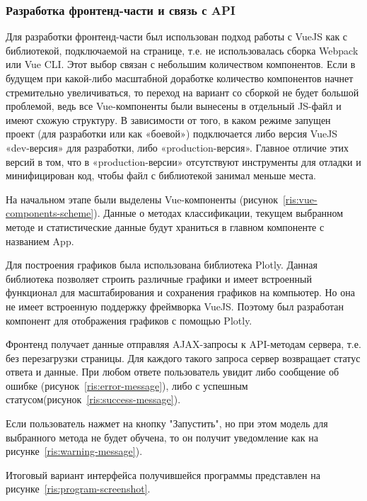 \subsubsection{Разработка фронтенд-части и связь с API}
Для разработки фронтенд-части был использован подход работы с VueJS как с библиотекой, подключаемой на странице, т.е. не использовалась сборка Webpack или Vue CLI. Этот выбор связан с небольшим количеством компонентов. Если в будущем при какой-либо масштабной доработке количество компонентов начнет стремительно увеличиваться, то переход на вариант со сборкой не будет большой проблемой, ведь все Vue-компоненты были вынесены в отдельный JS-файл и имеют схожую структуру. В зависимости от того, в каком режиме запущен проект (для разработки или как «боевой») подключается либо версия VueJS «dev-версия» для разработки, либо «production-версия». Главное отличие этих версий в том, что в «production-версии» отсутствуют инструменты для отладки и минифицирован код, чтобы файл с библиотекой занимал меньше места.
\par
На начальном этапе были выделены Vue-компоненты (рисунок~\ref{ris:vue-components-scheme}). Данные о методах классификации, текущем выбранном методе и статистические данные будут храниться в главном компоненте с названием App.
\par
Для построения графиков была использована библиотека Plotly. Данная библиотека позволяет строить различные графики и имеет встроенный функционал для масштабирования и сохранения графиков на компьютер. Но она не имеет встроенную поддержку фреймворка VueJS. Поэтому был разработан компонент для отображения графиков с помощью Plotly.
\par
Фронтенд получает данные отправляя AJAX-запросы к API-методам сервера, т.е. без перезагрузки страницы. Для каждого такого запроса сервер возвращает статус ответа и данные. При любом ответе пользователь увидит либо сообщение об ошибке (рисунок~\ref{ris:error-message}), либо с успешным статусом(рисунок~\ref{ris:success-message}). 
\par
Если пользователь нажмет на кнопку "Запустить", но при этом модель для выбранного метода не будет обучена, то он получит уведомление как на рисунке~\ref{ris:warning-message}).
\par
Итоговый вариант интерфейса получившейся программы представлен на рисунке~\ref{ris:program-screenshot}.

